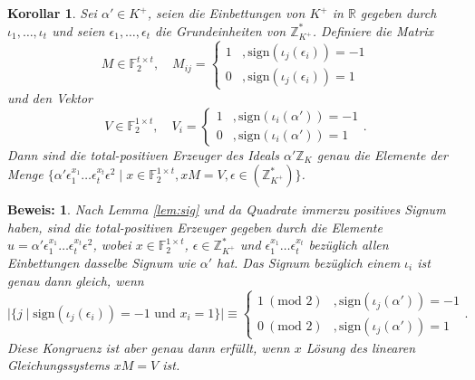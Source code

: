 \documentclass[12pt,a4paper,halfparskip,headsepline,bibtotocnumbered]{scrreprt}
\theoremstyle{nummermitklammern}
\newtheorem{korollar}[defsatzusw]{Korollar}
\theoremstyle{nonumberbreak}
\newtheorem{beweis}{Beweis:}
\newcommand{\Z}{\mathbb{Z}}
\newcommand{\R}{\mathbb{R}}
\newcommand{\F}{\mathbb{F}}
\begin{document}
\begin{framed}
	\begin{korollar}
		Sei $\alpha' \in K^+$, seien die Einbettungen von $K^+$ in $\R$ gegeben durch $\iota_1, \dots, \iota_{t}$ und seien $\epsilon_1, \dots, \epsilon_t$ die Grundeinheiten von $\Z_{K^+}^\ast$. 				Definiere die Matrix
		\begin{equation*}
			M \in \F_2^{t \times t}, \quad M_{ij} = \begin{cases} 1 &, \text{sign}(\iota_j(\epsilon_i)) = -1\\ 0 &, \text{sign}(\iota_j(\epsilon_i)) = 1\end{cases}
		\end{equation*}
		und den Vektor
		\begin{equation*}
			V \in \F_2^{1 \times t}, \quad V_i = \begin{cases} 1 &, \text{sign}(\iota_i(\alpha')) = -1\\ 0 &, \text{sign}(\iota_i(\alpha')) = 1\end{cases}.
		\end{equation*}
		Dann sind die total-positiven Erzeuger des Ideals $\alpha' \Z_K$ genau die Elemente der Menge $\lbrace \alpha' \epsilon_1^{x_1} \dots \epsilon_t^{x_t} \epsilon^2 \mid x \in \F_2^{1 \times t}, x M = V, \epsilon \in (\Z_{K^+}^\ast) \rbrace$.
	\end{korollar}
\end{framed}

\begin{beweis}
	Nach Lemma \eqref{lem:sig} und da Quadrate immerzu positives Signum haben, sind die total-positiven Erzeuger gegeben durch die Elemente $u = \alpha' \epsilon_1^{x_1} \dots \epsilon_t^{x_t} \epsilon^2$, wobei $x \in \F_2^{1 \times t}$, $\epsilon \in \Z_{K^+}^\ast$ und $\epsilon_1^{x_1} \dots \epsilon_t^{x_t}$ bezüglich allen Einbettungen dasselbe Signum wie $\alpha'$ hat. Das Signum bezüglich einem $\iota_i$ ist genau dann gleich, wenn
	\begin{equation*}
		\vert \lbrace j \mid \text{sign}(\iota_j(\epsilon_i)) = -1 \text{ und } x_i = 1 \rbrace \vert \equiv \begin{cases} 1 \ (\text{mod } 2) &,\text{sign}(\iota_j(\alpha')) = -1 \\ 0 \ (\text{mod } 2) &,\text{sign}(\iota_j(\alpha')) = 1 \end{cases}.
	\end{equation*}
	Diese Kongruenz ist aber genau dann erfüllt, wenn $x$ Lösung des linearen Gleichungssystems $xM = V$ ist.
\end{beweis}
\end{document}

